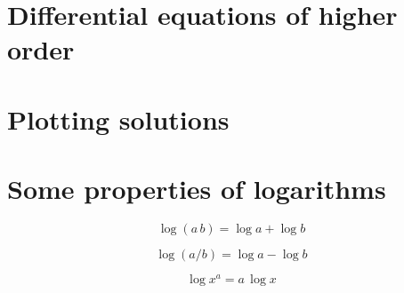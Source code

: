 \documentclass[12pt]{article}
\begin{document}
\section{Differential equations of higher order}

\section{Plotting solutions}


\appendix
\section{Some properties of logarithms}
\label{logprop}
\begin{equation}
 \log{(a \, b)} =	\log{a} + \log{b} 
\end{equation}

\begin{equation}
	\log{(a / b)} =	\log{a} - \log{b} 
\end{equation}

\begin{equation}
	\log{x^a} =a \, \log{x} 
\end{equation}
\end{document}
